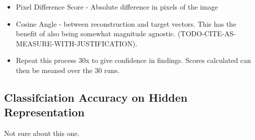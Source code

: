 \begin{itemize}
\begin{itemize}
\begin{itemize}
\begin{itemize}
        \item Pixel Difference Score - Absolute difference in pixels of the image
        \item Cosine Angle - between reconstruction and target vectors. This has the benefit of also being somewhat magnitude agnostic. (TODO-CITE-AS-MEASURE-WITH-JUSTIFICATION).
        \item Repeat this process 30x to give confidence in findings. Scores calculated can then be meaned over the 30 runs.
      \end{itemize}
    \end{itemize}
  \end{itemize}
\end{itemize}

\subsection{Classifciation Accuracy on Hidden Representation}
  Not sure about this one.
